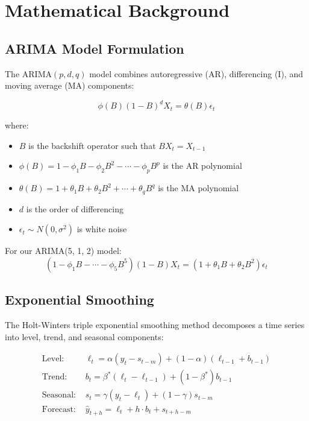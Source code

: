 \documentclass[12pt,a4paper]{report}
\begin{document}
\chapter{Mathematical Background}
\label{app:math}

\section{ARIMA Model Formulation}

The ARIMA$(p, d, q)$ model combines autoregressive (AR), differencing (I), and moving average (MA) components:

\begin{equation}
\phi(B)(1-B)^d X_t = \theta(B)\epsilon_t
\end{equation}

where:
\begin{itemize}
    \item $B$ is the backshift operator such that $BX_t = X_{t-1}$
    \item $\phi(B) = 1 - \phi_1 B - \phi_2 B^2 - \cdots - \phi_p B^p$ is the AR polynomial
    \item $\theta(B) = 1 + \theta_1 B + \theta_2 B^2 + \cdots + \theta_q B^q$ is the MA polynomial
    \item $d$ is the order of differencing
    \item $\epsilon_t \sim N(0, \sigma^2)$ is white noise
\end{itemize}

For our ARIMA(5, 1, 2) model:
\begin{equation}
(1-\phi_1 B - \cdots - \phi_5 B^5)(1-B) X_t = (1 + \theta_1 B + \theta_2 B^2)\epsilon_t
\end{equation}

\section{Exponential Smoothing}

The Holt-Winters triple exponential smoothing method decomposes a time series into level, trend, and seasonal components:

\begin{align}
\text{Level: } & \ell_t = \alpha(y_t - s_{t-m}) + (1-\alpha)(\ell_{t-1} + b_{t-1}) \\
\text{Trend: } & b_t = \beta^*(\ell_t - \ell_{t-1}) + (1-\beta^*)b_{t-1} \\
\text{Seasonal: } & s_t = \gamma(y_t - \ell_t) + (1-\gamma)s_{t-m} \\
\text{Forecast: } & \hat{y}_{t+h} = \ell_t + h \cdot b_t + s_{t+h-m}
\end{align}
\end{document}
